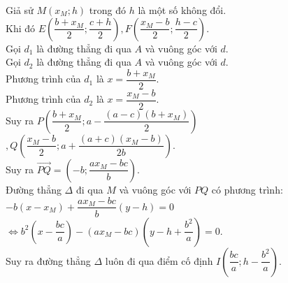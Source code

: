 \begin{bt}[VMO 2007-2008]
{		Giả sử $M(x_M;h)$ trong đó $h$ là một số không đổi.\\		
		Khi đó $E(\dfrac{b+x_M}{2};\dfrac{c+h}{2}),F(\dfrac{x_M-b}{2};\dfrac{h-c}{2})$.\\
		Gọi $d_1$ là đường thẳng đi qua $A$ và vuông góc với $d$.\\
		Gọi $d_2$ là đường thẳng đi qua $A$ và vuông góc với $d$.\\
		Phương trình của $d_1$ là $x=\dfrac{b+x_M}{2}$.\\
		Phương trình của $d_2$ là $x=\dfrac{x_M-b}{2}$.\\
		Suy ra $P\left(\dfrac{b+x_M}{2};a-\dfrac{(a-c)(b+x_M)}{2}\right)$$,Q(\dfrac{x_M-b}{2};a+\dfrac{(a+c)(x_M-b)}{2b})$.\\
		Suy ra $\overrightarrow{PQ}=(-b;\dfrac{ax_M-bc}{b})$.\\
		Đường thẳng $ \Delta $ đi qua $M$ và vuông góc với $PQ$ có phương trình:\\
		$-b(x-x_M)+\dfrac{ax_M-bc}{b}(y-h)=0$ $ \Leftrightarrow b^2(x-\dfrac{bc}{a})-(ax_M-bc)(y-h+\dfrac{b^2}{a})=0$.\\
		Suy ra đường thẳng $ \Delta $ luôn đi qua điểm cố định $I(\dfrac{bc}{a};h-\dfrac{b^2}{a})$.	
	}
\end{bt}
